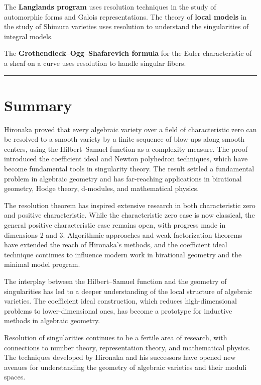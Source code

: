 The \textbf{Langlands program} uses resolution techniques in the study of automorphic forms and Galois representations. The theory of \textbf{local models} in the study of Shimura varieties uses resolution to understand the singularities of integral models.

The \textbf{Grothendieck--Ogg--Shafarevich formula} for the Euler characteristic of a sheaf on a curve uses resolution to handle singular fibers.


\begin{center}\rule{0.5\linewidth}{0.5pt}\end{center}

\section*{Summary}

Hironaka proved that every algebraic variety over a field of characteristic zero can be resolved to a smooth variety by a finite sequence of blow-ups along smooth centers, using the Hilbert--Samuel function as a complexity measure. The proof introduced the coefficient ideal and Newton polyhedron techniques, which have become fundamental tools in singularity theory. The result settled a fundamental problem in algebraic geometry and has far-reaching applications in birational geometry, Hodge theory, d-modules, and mathematical physics.

The resolution theorem has inspired extensive research in both characteristic zero and positive characteristic. While the characteristic zero case is now classical, the general positive characteristic case remains open, with progress made in dimensions 2 and 3. Algorithmic approaches and weak factorization theorems have extended the reach of Hironaka's methods, and the coefficient ideal technique continues to influence modern work in birational geometry and the minimal model program.

The interplay between the Hilbert--Samuel function and the geometry of singularities has led to a deeper understanding of the local structure of algebraic varieties. The coefficient ideal construction, which reduces high-dimensional problems to lower-dimensional ones, has become a prototype for inductive methods in algebraic geometry.

Resolution of singularities continues to be a fertile area of research, with connections to number theory, representation theory, and mathematical physics. The techniques developed by Hironaka and his successors have opened new avenues for understanding the geometry of algebraic varieties and their moduli spaces.

